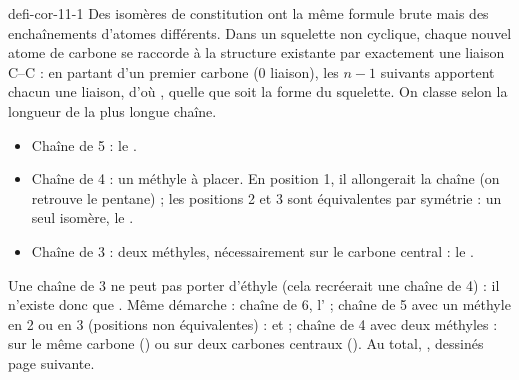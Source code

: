 \begin{blocEdition}{defi-cor-11-1}
Des isomères de constitution ont la même formule brute mais des enchaînements d'atomes différents. Dans un squelette
non cyclique, chaque nouvel atome de carbone se raccorde à la structure existante par exactement une liaison C--C :
en partant d'un premier carbone (0 liaison), les $n-1$ suivants apportent chacun une liaison, d'où
, quelle que soit la forme du squelette.
On classe selon la longueur de la plus longue chaîne.
\begin{itemize}[leftmargin=1.4em,itemsep=0.1em]
\item Chaîne de 5 : le .
\item Chaîne de 4 : un méthyle à placer. En position 1, il allongerait la chaîne (on retrouve le pentane) ; les
positions 2 et 3 sont équivalentes par symétrie : un seul isomère, le .
\item Chaîne de 3 : deux méthyles, nécessairement sur le carbone central : le .
\end{itemize}
Une chaîne de 3 ne peut pas porter d'éthyle (cela recréerait une chaîne de 4) : il n'existe donc que
.
Même démarche : chaîne de 6, l' ; chaîne de 5 avec un méthyle en 2 ou en 3 (positions non
équivalentes) :  et  ; chaîne de 4 avec deux méthyles : sur le
même carbone () ou sur deux carbones centraux ().
Au total, , dessinés page suivante.
\end{blocEdition}

